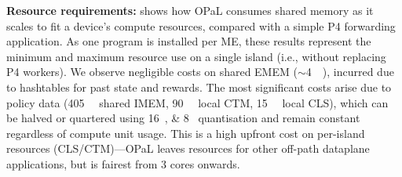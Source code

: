 \documentclass[
sigconf,natbib=false
]{acmart}
\newcommand{\fakepara}[1]{\noindent\textbf{#1:}}
\newcommand{\approachshort}{OPaL}
\newcommand{\Coopfw}{\emph{CoOp}}
\newcommand{\Indfw}{\emph{Ind}}
\begin{document}
\fakepara{Resource requirements}
 shows how \approachshort{} consumes shared memory as it scales to fit a device's compute resources, compared with a simple P4 forwarding application.
As one program is installed per ME, these results represent the minimum and maximum resource use on a single island (i.e., without replacing P4 workers).
We observe negligible costs on shared EMEM ($\sim$\SI{4}{\mebi\byte}), incurred due to hashtables for past state and rewards.
The most significant costs arise due to policy data (\SI{405}{\kibi\byte} shared IMEM, \SI{90}{\kibi\byte} local CTM, \SI{15}{\kibi\byte} local CLS), which can be halved or quartered using \SIlist{16;8}{\bit} quantisation and remain constant regardless of compute unit usage.
This is a high upfront cost on per-island resources (CLS/CTM)---\approachshort{} leaves resources for other off-path dataplane applications, but is fairest from 3 cores onwards.

\end{document}
